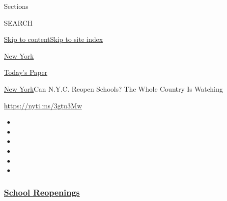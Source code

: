 Sections

SEARCH

\protect\hyperlink{site-content}{Skip to
content}\protect\hyperlink{site-index}{Skip to site index}

\href{https://www.nytimes3xbfgragh.onion/section/nyregion}{New York}

\href{https://myaccount.nytimes3xbfgragh.onion/auth/login?response_type=cookie\&client_id=vi}{}

\href{https://www.nytimes3xbfgragh.onion/section/todayspaper}{Today's
Paper}

\href{/section/nyregion}{New York}\textbar{}Can N.Y.C. Reopen Schools?
The Whole Country Is Watching

\url{https://nyti.ms/3gtu3Mw}

\begin{itemize}
\item
\item
\item
\item
\item
\item
\end{itemize}

\hypertarget{school-reopenings}{%
\subsubsection{\texorpdfstring{\href{https://www.nytimes3xbfgragh.onion/spotlight/schools-reopening?name=styln-coronavirus-schools-reopening\&region=TOP_BANNER\&block=storyline_menu_recirc\&action=click\&pgtype=Article\&impression_id=6568bd20-f2ca-11ea-bc7c-8fd709e972c8\&variant=undefined}{School
Reopenings}}{School Reopenings}}\label{school-reopenings}}


